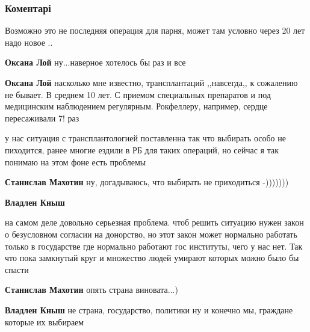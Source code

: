  
 
 
 
 
\subsubsection{Коментарі}
\label{sec:27_09_2021.fb.knysh_vladlen.1.lvov_operacii.cmt}

\begin{itemize} %
Возможно это не последняя операция для парня, может там условно через 20 лет надо новое ..

\begin{itemize} %
\textbf{Оксана Лой} ну...наверное хотелось бы раз и все

\textbf{Оксана Лой} насколько мне известно, трансплантаций ,,навсегда,, к сожалению не бывает. В среднем 10 лет. С приемом специальных препаратов и под медицинским наблюдением регулярным. Рокфеллеру, например, сердце пересаживали 7! раз
\end{itemize} %


у нас ситуация с трансплантологией поставленна так что выбирать особо не
пиходится, ранее многие ездили в РБ для таких операций, но сейчас я так понимаю
на этом фоне есть проблемы

\begin{itemize} %
\textbf{Станислав Махотин} ну, догадываюсь, что выбирать не приходиться -)))))))

\textbf{Владлен Кныш} 

на самом деле довольно серьезная проблема. чтоб решить ситуацию нужен закон о
безусловном согласии на донорство, но этот закон может нормально работать
только в государстве где нормально работают гос институты, чего у нас нет. Так
что пока замкнутый круг и множество людей умирают которых можно было бы спасти


\textbf{Станислав Махотин} опять страна виновата...)

\textbf{Владлен Кныш} не страна, государство, политики ну и конечно мы, граждане которые их выбираем
\end{itemize} %

\end{itemize} %
